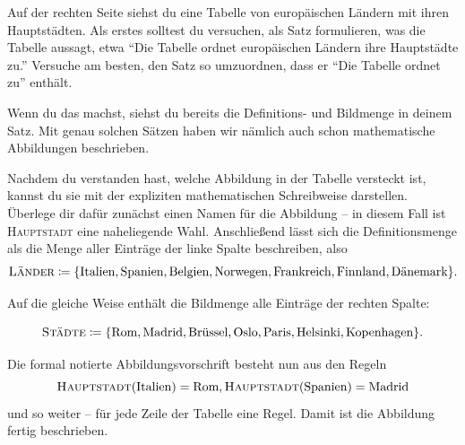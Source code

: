 \documentclass[../../main.tex]{subfiles}
\begin{document}
\begin{example}
    
    Auf der rechten Seite siehst du eine Tabelle von europäischen Ländern mit ihren Hauptstädten. Als erstes solltest du versuchen, als Satz formulieren, was die Tabelle aussagt, etwa \enquote{Die Tabelle ordnet europäischen Ländern ihre Hauptstädte zu.} Versuche am besten, den Satz so umzuordnen, dass er \enquote{Die Tabelle ordnet zu} enthält.
    
    Wenn du das machst, siehst du bereits die Definitions- und Bildmenge in deinem Satz. Mit genau solchen Sätzen haben wir nämlich auch schon mathematische Abbildungen beschrieben.
    
    Nachdem du verstanden hast, welche Abbildung in der Tabelle versteckt ist, kannst du sie mit der expliziten mathematischen Schreibweise darstellen. Überlege dir dafür zunächst einen Namen für die Abbildung -- in diesem Fall ist \textsc{Hauptstadt} eine naheliegende Wahl. Anschließend lässt sich die Definitionsmenge als die Menge aller Einträge der linke Spalte beschreiben, also
    \[\textsc{Länder}\coloneqq\{\text{Italien},\text{Spanien},\text{Belgien},\text{Norwegen},\text{Frankreich},\text{Finnland},\text{Dänemark}\}.\]
    
    Auf die gleiche Weise enthält die Bildmenge alle Einträge der rechten Spalte:
    
    \[\textsc{Städte}\coloneqq\{\text{Rom},\text{Madrid},\text{Brüssel},\text{Oslo},\text{Paris},\text{Helsinki},\text{Kopenhagen}\}.\]
    
    \sloppy
    Die formal notierte Abbildungsvorschrift besteht nun aus den Regeln \[\textsc{Hauptstadt}(\text{Italien})=\text{Rom}, \textsc{Hauptstadt}(\text{Spanien})=\text{Madrid}\] und so weiter -- für jede Zeile der Tabelle eine Regel. Damit ist die Abbildung fertig beschrieben.
    \fussy
\end{example}
\end{document}
